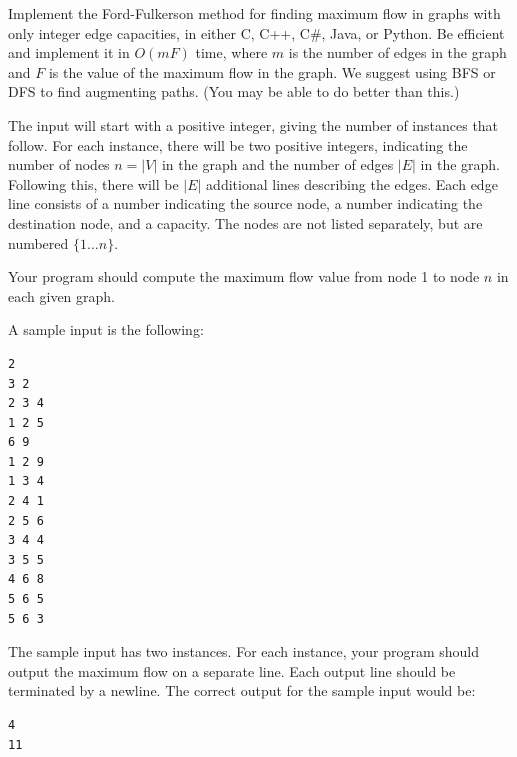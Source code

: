 \documentclass[solutionorbox,answers]{exam} %
\begin{document}
\begin{questions}
\begin{parts}
\begin{solutionbox}{1.75in}


\end{solutionbox}

\end{parts}

\newpage

\question Implement the Ford-Fulkerson method for finding maximum flow in graphs with only integer edge capacities, in either C, C++, C\#, Java, or Python. Be efficient and implement it in $O(mF)$ time, where $m$ is the number of edges in the graph and $F$ is the value of the maximum flow in the graph. We suggest using BFS or DFS to find augmenting paths. (You may be able to do better than this.)

The input will start with a positive integer, giving the number of instances that follow. For each instance, there will be two positive integers, indicating the number of nodes $n = |V|$ in the graph and the number of edges $|E|$ in the graph. Following this, there will be $|E|$ additional lines describing the edges. Each edge line consists of a number indicating the source node, a number indicating the destination node, and a capacity. The nodes are not listed separately, but are numbered $\{1\ldots n\}$.

Your program should compute the maximum flow value from node 1 to node $n$ in each given graph.

A sample input is the following:

\begin{verbatim}
2
3 2
2 3 4
1 2 5
6 9
1 2 9
1 3 4
2 4 1
2 5 6
3 4 4
3 5 5
4 6 8
5 6 5
5 6 3
\end{verbatim}

The sample input has two instances. For each instance, your program should output the maximum flow on a separate line. Each output line should be terminated by a newline. The correct output for the sample input would be:
\begin{verbatim}
4
11
\end{verbatim}

\end{questions}
\end{document}
